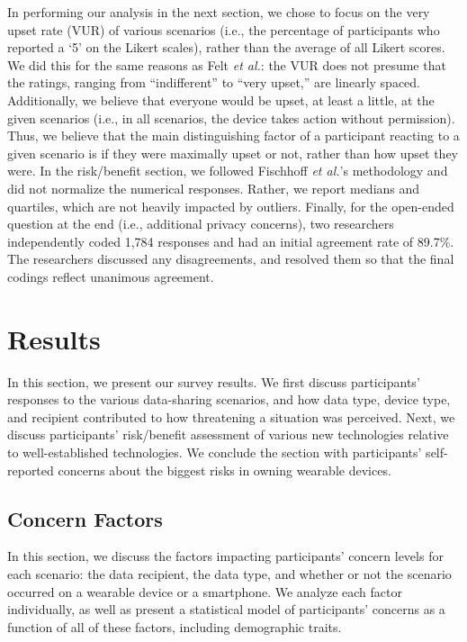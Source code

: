 \documentclass{acm_proc_article-sp}
\begin{document}
In performing our analysis in the next section, we chose to focus on the very upset rate (VUR) of various scenarios (i.e., the percentage of participants who reported a `5' on the Likert scales), rather than the average of all Likert scores. We did this for the same reasons as Felt {\it et al.}: the VUR does not presume that the ratings, ranging from ``indifferent'' to ``very upset,'' are linearly spaced. Additionally, we believe that everyone would be upset, at least a little, at the given scenarios (i.e., in all scenarios, the device takes action without permission). Thus, we believe that the main distinguishing factor of a participant reacting to a given scenario is if they were maximally upset or not, rather than how upset they were. In the risk/benefit section, we followed Fischhoff {\it et al.}'s methodology and did not normalize the numerical responses. Rather, we report medians and quartiles, which are not heavily impacted by outliers. Finally, for the open-ended question at the end (i.e., additional privacy concerns), two researchers independently coded 1,784 responses and had an initial agreement rate of 89.7\%. The researchers discussed any disagreements, and resolved them so that the final codings reflect unanimous agreement.


\section{Results}
In this section, we present our survey results. We first discuss participants' responses to the various data-sharing scenarios, and how data type, device type, and recipient contributed to how threatening a situation was perceived. Next, we discuss participants' risk/benefit assessment of various new technologies relative to well-established technologies. We conclude the section with participants' self-reported concerns about the biggest risks in owning wearable devices.

\subsection{Concern Factors}
In this section, we discuss the factors impacting participants' concern levels for each scenario: the data recipient, the data type, and whether or not the scenario occurred on a wearable device or a smartphone. We analyze each factor individually, as well as present a statistical model of participants' concerns as a function of all of these factors, including demographic traits.
\end{document}
